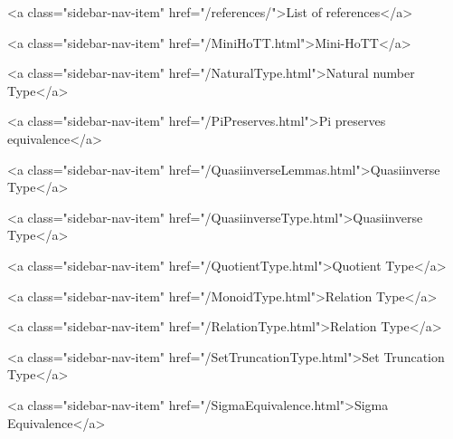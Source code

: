           <a class="sidebar-nav-item" href="/references/">List of references</a>
        
      
    
      
        
          <a class="sidebar-nav-item" href="/MiniHoTT.html">Mini-HoTT</a>
        
      
    
      
        
          <a class="sidebar-nav-item" href="/NaturalType.html">Natural number Type</a>
        
      
    
      
        
          <a class="sidebar-nav-item" href="/PiPreserves.html">Pi preserves equivalence</a>
        
      
    
      
        
          <a class="sidebar-nav-item" href="/QuasiinverseLemmas.html">Quasiinverse Type</a>
        
      
    
      
        
          <a class="sidebar-nav-item" href="/QuasiinverseType.html">Quasiinverse Type</a>
        
      
    
      
        
          <a class="sidebar-nav-item" href="/QuotientType.html">Quotient Type</a>
        
      
    
      
        
          <a class="sidebar-nav-item" href="/MonoidType.html">Relation Type</a>
        
      
    
      
        
          <a class="sidebar-nav-item" href="/RelationType.html">Relation Type</a>
        
      
    
      
        
          <a class="sidebar-nav-item" href="/SetTruncationType.html">Set Truncation Type</a>
        
      
    
      
        
          <a class="sidebar-nav-item" href="/SigmaEquivalence.html">Sigma Equivalence</a>
        
      
    
